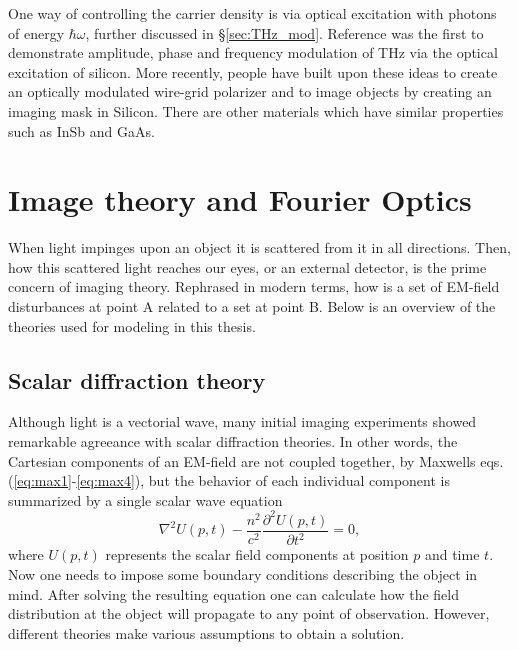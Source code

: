 One way of controlling the carrier density is via optical excitation with photons of energy $\hbar \omega$, further discussed in \S \ref{sec:THz_mod}. Reference \cite{Photo.Si} was the first to demonstrate amplitude, phase and frequency modulation of THz via the optical excitation of silicon. More recently, people have built upon these ideas to create an optically modulated wire-grid polarizer \cite{Siopticalpolarizer} and to image objects by creating an imaging mask \cite{Photo.Single} in Silicon. There are other materials which have similar properties such as InSb and GaAs. 






\section{Image theory and Fourier Optics}
When light impinges upon an object it is scattered from it in all directions. Then, how this scattered light reaches our eyes, or an external detector, is the prime concern of imaging theory. Rephrased in modern terms, how is a set of EM-field disturbances at point A related to a set at point B. Below is an overview of the theories used for modeling in this thesis.

\subsection{Scalar diffraction theory}\label{sec:scalar_diffraction}
Although light is a vectorial wave, many initial imaging experiments showed remarkable agreeance with scalar diffraction theories. In other words, the Cartesian components of an EM-field are not coupled together, by Maxwells eqs. (\ref{eq:max1}-\ref{eq:max4}), but the behavior of each individual component is summarized by a single scalar wave equation \cite{F.optics}
\begin{equation}
\nabla^2 U(p,t) - \frac{n^2}{c^2}\frac{\partial^2 U(p,t)}{\partial t^2}=0,
\label{eq:scalar_wave}
\end{equation}
where $U(p,t)$ represents the scalar field components at position $p$ and time $t$. Now one needs to impose some boundary conditions describing the object in mind. After solving the resulting equation one can calculate how the field distribution at the object will propagate to any point of observation. However, different theories make various assumptions to obtain a solution. 



